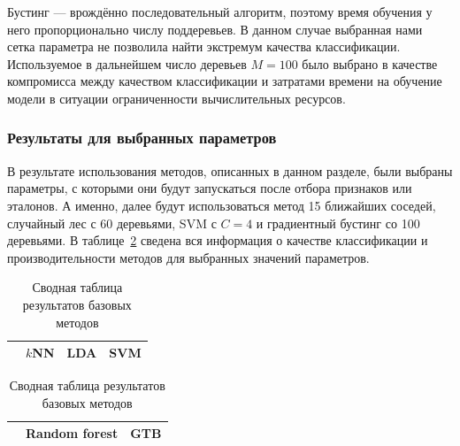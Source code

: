 Бустинг --- врождённо последовательный алгоритм, поэтому время обучения у него пропорционально числу поддеревьев. В данном случае выбранная нами сетка параметра не позволила найти экстремум качества классификации. Используемое в дальнейшем число деревьев \(M=100\) было выбрано в качестве компромисса между качеством классификации и затратами времени на обучение модели в ситуации ограниченности вычислительных ресурсов.

\subsubsection{Результаты для выбранных параметров}
В результате использования методов, описанных в данном разделе, были выбраны параметры, с которыми они будут запускаться после отбора признаков или эталонов. А именно, далее будут использоваться метод 15 ближайших соседей, случайный лес с 60 деревьями, SVM с \(C=4\) и градиентный бустинг со 100 деревьями. В таблице~\ref{table:base-all} сведена вся информация о качестве классификации и производительности методов для выбранных значений параметров.

\begin{table}[h!]
    \centering
    \begin{tabular}{|c||c|c|c|}
		\cline{2-4}
		\multicolumn{1}{c||}{} & \(k\)NN & LDA & SVM \\
		\hline \hline
		
    \end{tabular}
\newline \vspace*{0.5cm} \newline
	\begin{tabular}{|c||c|c|}
		\cline{2-3}
		\multicolumn{1}{c||}{} & Random forest & GTB \\
		\hline \hline
		
	\end{tabular}
    \caption{Сводная таблица результатов базовых методов}
    \label{table:base-all}
\end{table}

